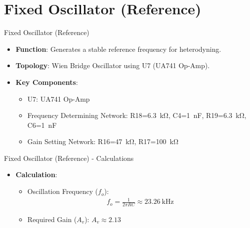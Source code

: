 \documentclass[10pt,xcolor={table,dvipsnames},t]{beamer}
\begin{document}
\section{Fixed Oscillator (Reference)}

\begin{frame}{Fixed Oscillator (Reference)}
\begin{itemize}
    \item \textbf{Function}: Generates a stable reference frequency for heterodyning.
    \item \textbf{Topology}: Wien Bridge Oscillator using U7 (UA741 Op-Amp).
    \item \textbf{Key Components}:
    \begin{itemize}
        \item U7: UA741 Op-Amp
        \item Frequency Determining Network: R18=\SI{6.3}{\kilo\ohm}, C4=\SI{1}{\nano\farad}, R19=\SI{6.3}{\kilo\ohm}, C6=\SI{1}{\nano\farad}
        \item Gain Setting Network: R16=\SI{47}{\kilo\ohm}, R17=\SI{100}{\kilo\ohm}
    \end{itemize}
\end{itemize}
\end{frame}

\begin{frame}{Fixed Oscillator (Reference) - Calculations}
\begin{itemize}
    \item \textbf{Calculation}:
    \begin{itemize}
        \item Oscillation Frequency ($f_o$):
        \begin{align*}
        f_o = \frac{1}{2\pi RC} \approx \SI{23.26}{\kilo\hertz}
        \end{align*}
        \item Required Gain ($A_v$): $A_v \approx 2.13$
    \end{itemize}
\end{itemize}
\end{frame}
\end{document}
